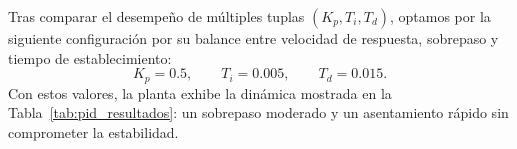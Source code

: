 Tras comparar el desempeño de múltiples tuplas \((K_p,T_i,T_d)\), optamos por la siguiente configuración por su balance entre velocidad de respuesta, sobrepaso y tiempo de establecimiento:
\[
K_p = 0.5,\qquad T_i = 0.005,\qquad T_d = 0.015.
\]
Con estos valores, la planta exhibe la dinámica mostrada en la Tabla~\ref{tab:pid_resultados}: un sobrepaso moderado y un asentamiento rápido sin comprometer la estabilidad.
\begin{table}[!t] %
	\centering
	\small
	\setlength{\tabcolsep}{4pt} %
	\caption{Resultados de la sintonía por prueba y error seleccionada.}
	\label{tab:pid_resultados}

\end{table}



		

